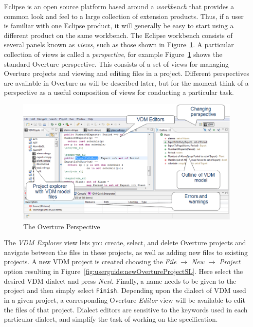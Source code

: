 \documentclass{overturerepchap}
\begin{document}
Eclipse is an open source platform based around a
\emph{workbench} that provides a common look and feel
to a large collection of extension products. Thus, if a user is
familiar with one Eclipse product, it will generally be easy to start
using a different product on the same workbench. The Eclipse workbench
consists of several panels known as \emph{views}, such as
those shown in
Figure~\ref{fig:userguire:OverturePerspective}. A particular collection of views
is called a \emph{perspective}, for example
Figure~\ref{fig:userguire:OverturePerspective} shows the standard
Overture perspective. This consists of a set of views for managing
Overture projects and viewing and editing files in a
project. Different perspectives are available in Overture as will be
described later, but for the moment think of a perspective as a
useful composition of views for conducting a particular task.

\begin{figure}[!h]
\begin{center}
  \includegraphics[width=\textwidth]{figures/OverturePerspective}
  \caption[labelInTOC]{The Overture Perspective}
  \label{fig:userguire:OverturePerspective}
\end{center}
\end{figure}

The \emph{VDM Explorer} view lets you create, select, 
and delete Overture projects and navigate between the files in these 
projects, as well as adding new files to existing projects. A new VDM
project is created choosing the \emph{File} $ \rightarrow$ \emph{New}
$\rightarrow$ \emph{Project} option resulting in
Figure~\ref{fig:userguide:newOvertureProjectSL}. Here select
the desired VDM dialect and press \emph{Next}. Finally, a name needs 
to be given to the project and then simply select \texttt{Finish}.
Depending upon the dialect of VDM used in a given project,
a corresponding Overture \emph{Editor} view will be available to edit the files of
that project. Dialect editors are sensitive to the keywords used in
each particular dialect, and simplify the task of working on the
specification.
\end{document}
